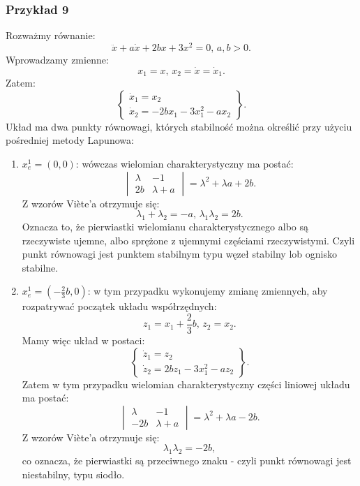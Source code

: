 \documentclass{article}
\begin{document}
        \subsubsection{Przykład 9}
        Rozważmy równanie:
        \begin{equation}
            \ddot{x} + a\dot{x} + 2bx + 3x^{2} = 0,\,a, b>0.
        \end{equation}
        Wprowadzamy zmienne:
        $$
            x_{1} = x,\,x_{2} = \dot{x} = \dot{x}_{1}.
        $$
        Zatem:
        $$
            \left\{
            \begin{array}{l}
                 \dot{x}_{1} = x_{2}\\
                 \dot{x}_{2} = -2bx_{1} - 3x_{1}^{2} - ax_{2}
            \end{array}
            \right\}.
        $$
        Układ ma dwa punkty równowagi, których stabilność można określić przy użyciu pośredniej metody Lapunowa:
        \begin{enumerate}
            \item $x_{e}^{1} = \left( 0, 0 \right)$: wówczas wielomian charakterystyczny ma postać:
            $$
                \begin{vmatrix}
                    \lambda & -1\\ 2b & \lambda + a
                \end{vmatrix}
                =
                \lambda^{2} + \lambda a + 2b.
            $$
            Z wzorów Viète’a otrzymuje się:
            $$
                \lambda_{1} + \lambda_{2} = -a,\, \lambda_{1}\lambda_{2}=2b.
            $$
            Oznacza to, że pierwiastki wielomianu charakterystycznego albo są rzeczywiste ujemne, albo sprężone z ujemnymi częściami rzeczywistymi.
            Czyli punkt równowagi jest punktem stabilnym typu węzeł stabilny lob ognisko stabilne.
            \item $x_{e}^{1} = \left( -\frac{2}{3}b, 0 \right)$: w tym przypadku wykonujemy zmianę zmiennych, aby rozpatrywać początek układu współrzędnych:
            $$
                z_{1} = x_{1} + \frac{2}{3}b,\,z_{2} = x_{2}.
            $$
            Mamy więc układ w postaci:
            $$
                \left\{
                \begin{array}{l}
                     \dot{z}_{1} = z_{2}\\
                     \dot{z}_{2} = 2bz_{1} - 3x_{1}^{2} - az_{2}
                \end{array}
                \right\}.
            $$
            Zatem w tym przypadku wielomian charakterystyczny części liniowej układu ma postać:
            $$
                \begin{vmatrix}
                    \lambda & -1\\ -2b & \lambda + a
                \end{vmatrix}
                =
                \lambda^{2} + \lambda a - 2b.
            $$
            Z wzorów Viète’a otrzymuje się:
            $$
                \lambda_{1}\lambda_{2}=-2b,
            $$
            co oznacza, że pierwiastki są przeciwnego znaku - czyli punkt równowagi jest niestabilny, typu siodło.
        \end{enumerate}
\end{document}
